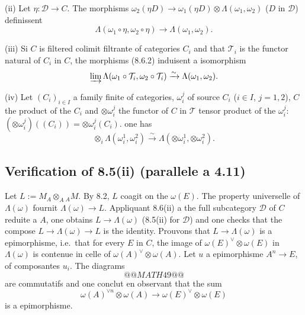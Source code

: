 \documentclass[12pt,a4paper]{article}
\theoremstyle{plain}
\theoremstyle{definition}
\begin{document}
\textup{(ii)} Let $\eta : \mathcal{D} \to C$. The morphisms $\omega_2(\eta D) \to \omega_1(\eta D) \otimes \Lambda(\omega_1, \omega_2)$ ($D$ in $\mathcal{D}$) definissent
\begin{equation}\label{eq:8.6.2}
\Lambda(\omega_1 \circ \eta, \omega_2 \circ \eta) \to \Lambda(\omega_1, \omega_2).
\end{equation}

\textup{(iii)} Si $C$ is filtered colimit filtrante of categories $C_i$ and that $\mathcal{T}_i$ is the functor natural of $C_i$ in $C$, the morphisms (8.6.2) induisent a isomorphism
\begin{equation}\label{eq:8.6.3}
\varinjlim \Lambda(\omega_1 \circ \mathcal{T}_i, \omega_2 \circ \mathcal{T}_i) \xrightarrow{\sim} \Lambda(\omega_1, \omega_2).
\end{equation}

\textup{(iv)} Let $(C_i)_{i \in I}$ a family finite of categories, $\omega_i^j$ of source $C_i$ ($i \in I$, $j = 1, 2$), $C$ the product of the $C_i$ and $\otimes \omega_i^j$ the functor of $C$ in $\mathcal{T}$ tensor product of the $\omega_i^j$: $(\otimes \omega_i^j)((C_i)) = \otimes \omega_i^j(C_i)$. one has
\begin{equation}\label{eq:8.6.4}
\otimes_i \Lambda(\omega_i^1, \omega_i^2) \xrightarrow{\sim} \Lambda(\otimes \omega_i^1, \otimes \omega_i^2).
\end{equation}

\subsection{Verification of 8.5\textup{(ii)} (parallele a 4.11)}

Let $L := M_A \otimes_A {_A M}$. By 8.2, $L$ coagit on the $\omega(E)$. The property universelle of $\Lambda(\omega)$ fournit $\Lambda(\omega) \to L$. Appliquant 8.6(ii) a the full subcategory $\mathcal{D}$ of $C$ reduite a $A$, one obtains $L \to \Lambda(\omega)$ (8.5(ii) for $\mathcal{D}$) and one checks that the compose $L \to \Lambda(\omega) \to L$ is the identity. Prouvons that $L \to \Lambda(\omega)$ is a epimorphisme, i.e.~that for every $E$ in $C$, the image of $\omega(E)^\vee \otimes \omega(E)$ in $\Lambda(\omega)$ is contenue in celle of $\omega(A)^\vee \otimes \omega(A)$. Let $u$ a epimorphisme $A^n \to E$, of composantes $u_i$. The diagrams
\[
@@MATH49@@
\]
are commutatifs and one conclut en observant that the sum
\[
\omega(A)^{\vee n} \otimes \omega(A) \to \omega(E)^\vee \otimes \omega(E)
\]
is a epimorphisme.
\end{document}

